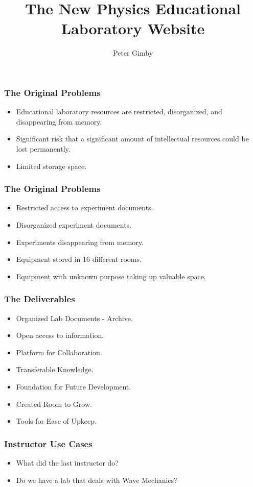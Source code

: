 \documentclass{beamer}
\title{The New Physics Educational Laboratory Website}
\author{Peter Gimby}
\begin{document}
\maketitle

  \begin{frame}
    \frametitle{The Original Problems}\color{black}
    \begin{itemize}
    		\item Educational laboratory resources are restricted, disorganized, and 				disappearing from memory.
		\item Significant risk that a significant amount of intellectual 						resources could be lost permanently.
		\item Limited storage space.
    \end{itemize}
  \end{frame}

  \begin{frame}
    \frametitle{The Original Problems}\color{black}
	\begin{itemize}
		\item Restricted access to experiment documents.
		\item Disorganized experiment documents.
		\item Experiments disappearing from memory.
		\item Equipment stored in 16 different rooms.
		\item Equipment with unknown purpose taking up valuable space.
	\end{itemize}
  \end{frame}

  \begin{frame}
    \frametitle{The Deliverables}\color{black}
	\begin{itemize}
		\item Organized Lab Documents - Archive.
		\item Open access to information.
		\item Platform for Collaboration.
		\item Transferable Knowledge.
		\item Foundation for Future Development.
		\item Created Room to Grow.
		\item Tools for Ease of Upkeep.
	\end{itemize}
  \end{frame}

  \begin{frame}
    \frametitle{Instructor Use Cases}
    \begin{itemize}
    		\item What did the last instructor do?
	    \item Do we have a lab that deals with Wave Mechanics?
    \end{itemize}
  \end{frame}
\end{document}

